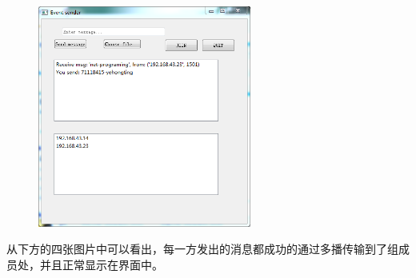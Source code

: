 \documentclass[UTF8]{ctexart}
\begin{document}
{\begin{figure}
\begin{minipage}{7cm}
	\end{minipage}
	\begin{minipage}{7cm}
		\includegraphics[width=7cm]{send_msg_2.png}
	\end{minipage}
\end{figure}
\par{从下方的四张图片中可以看出，每一方发出的消息都成功的通过多播传输到了组成员处，并且正常显示在界面中。}
}
\\\\\\\\
\end{document}
